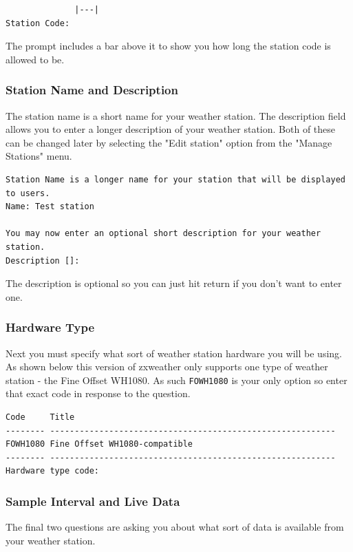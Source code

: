 \documentclass[a4paper,10pt,draft]{book}
\begin{document}
\begin{verbatim}
              |---|
Station Code:
\end{verbatim}

The prompt includes a bar above it to show you how long the station code is allowed to be.

\subsubsection{Station Name and Description}
The station name is a short name for your weather station. The description field allows you to enter a longer description of your weather station. Both of these can be changed later by selecting the "Edit station" option from the "Manage Stations" menu.

\begin{verbatim}
Station Name is a longer name for your station that will be displayed 
to users.
Name: Test station

You may now enter an optional short description for your weather
station.
Description []:
\end{verbatim}

The description is optional so you can just hit return if you don't want to enter one.

\subsubsection{Hardware Type}
Next you must specify what sort of weather station hardware you will be using. As shown below this version of zxweather only supports one type of weather station - the Fine Offset WH1080. As such \verb|FOWH1080| is your only option so enter that exact code in response to the question.

\begin{verbatim}
Code     Title
-------- ----------------------------------------------------------
FOWH1080 Fine Offset WH1080-compatible
-------- ----------------------------------------------------------
Hardware type code:
\end{verbatim}

\subsubsection{Sample Interval and Live Data}

The final two questions are asking you about what sort of data is available from your weather station.
\end{document}
